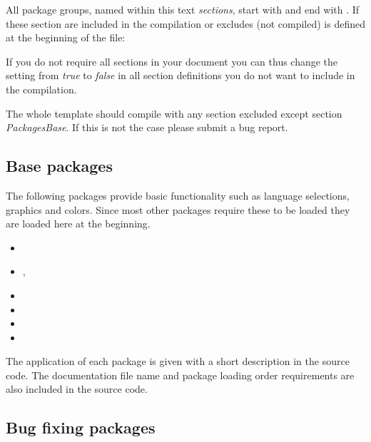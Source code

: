All package groups, named within this text \emph{sections}, start with  and end with . If these section are included in the compilation or excludes (not compiled) is defined at the beginning of the file:


If you do not require all sections in your document you can thus change the setting from \emph{true} to \emph{false} in all section definitions you do not want to include in the compilation.

The whole template should compile with any section excluded except section \emph{PackagesBase}. If this is not the case please submit a bug report.

\subsection{Base packages}
\label{sec:packages:base}
The following packages provide basic functionality such as language selections, graphics and colors. Since most other packages require these to be loaded they are loaded here at the beginning. 

\begin{itemize}[noitemsep]
\item {}
\item {}, 
\item {}
\item {}
\item {}
\item {}
\end{itemize}

The application of each package is given with a short description in the source code. The documentation file name and package loading order requirements are also included in the source code. 


\subsection{Bug fixing packages}
\label{sec:packages:bugfix}

